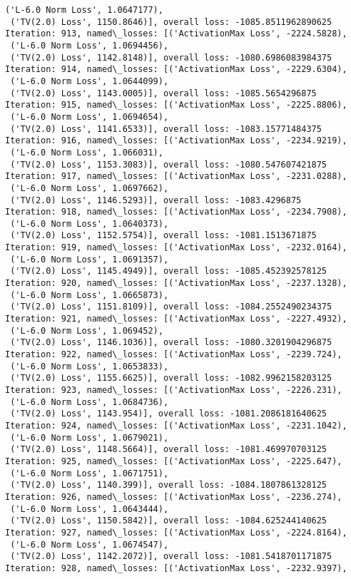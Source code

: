 \documentclass[10pt]{article}
\begin{document}
\begin{Verbatim}[commandchars=\\\{\}]
 ('L-6.0 Norm Loss', 1.0647177),
 ('TV(2.0) Loss', 1150.8646)], overall loss: -1085.8511962890625
Iteration: 913, named\_losses: [('ActivationMax Loss', -2224.5828),
 ('L-6.0 Norm Loss', 1.0694456),
 ('TV(2.0) Loss', 1142.8148)], overall loss: -1080.6986083984375
Iteration: 914, named\_losses: [('ActivationMax Loss', -2229.6304),
 ('L-6.0 Norm Loss', 1.0644099),
 ('TV(2.0) Loss', 1143.0005)], overall loss: -1085.5654296875
Iteration: 915, named\_losses: [('ActivationMax Loss', -2225.8806),
 ('L-6.0 Norm Loss', 1.0694654),
 ('TV(2.0) Loss', 1141.6533)], overall loss: -1083.15771484375
Iteration: 916, named\_losses: [('ActivationMax Loss', -2234.9219),
 ('L-6.0 Norm Loss', 1.066031),
 ('TV(2.0) Loss', 1153.3083)], overall loss: -1080.547607421875
Iteration: 917, named\_losses: [('ActivationMax Loss', -2231.0288),
 ('L-6.0 Norm Loss', 1.0697662),
 ('TV(2.0) Loss', 1146.5293)], overall loss: -1083.4296875
Iteration: 918, named\_losses: [('ActivationMax Loss', -2234.7908),
 ('L-6.0 Norm Loss', 1.0640373),
 ('TV(2.0) Loss', 1152.5754)], overall loss: -1081.1513671875
Iteration: 919, named\_losses: [('ActivationMax Loss', -2232.0164),
 ('L-6.0 Norm Loss', 1.0691357),
 ('TV(2.0) Loss', 1145.4949)], overall loss: -1085.452392578125
Iteration: 920, named\_losses: [('ActivationMax Loss', -2237.1328),
 ('L-6.0 Norm Loss', 1.0665873),
 ('TV(2.0) Loss', 1151.8109)], overall loss: -1084.2552490234375
Iteration: 921, named\_losses: [('ActivationMax Loss', -2227.4932),
 ('L-6.0 Norm Loss', 1.069452),
 ('TV(2.0) Loss', 1146.1036)], overall loss: -1080.3201904296875
Iteration: 922, named\_losses: [('ActivationMax Loss', -2239.724),
 ('L-6.0 Norm Loss', 1.0653833),
 ('TV(2.0) Loss', 1155.6625)], overall loss: -1082.9962158203125
Iteration: 923, named\_losses: [('ActivationMax Loss', -2226.231),
 ('L-6.0 Norm Loss', 1.0684736),
 ('TV(2.0) Loss', 1143.954)], overall loss: -1081.2086181640625
Iteration: 924, named\_losses: [('ActivationMax Loss', -2231.1042),
 ('L-6.0 Norm Loss', 1.0679021),
 ('TV(2.0) Loss', 1148.5664)], overall loss: -1081.469970703125
Iteration: 925, named\_losses: [('ActivationMax Loss', -2225.647),
 ('L-6.0 Norm Loss', 1.0671751),
 ('TV(2.0) Loss', 1140.399)], overall loss: -1084.1807861328125
Iteration: 926, named\_losses: [('ActivationMax Loss', -2236.274),
 ('L-6.0 Norm Loss', 1.0643444),
 ('TV(2.0) Loss', 1150.5842)], overall loss: -1084.625244140625
Iteration: 927, named\_losses: [('ActivationMax Loss', -2224.8164),
 ('L-6.0 Norm Loss', 1.0674547),
 ('TV(2.0) Loss', 1142.2072)], overall loss: -1081.5418701171875
Iteration: 928, named\_losses: [('ActivationMax Loss', -2232.9397),

\end{Verbatim}
\end{document}

